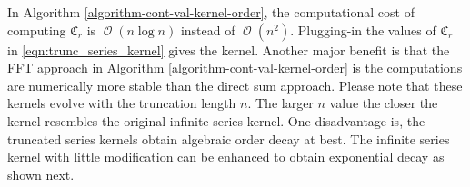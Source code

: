 \documentclass{svjour3}                     %
\DeclareMathOperator{\Order}{{\mathcal O}}
\newcommand{\bm}[1]{\boldsymbol{#1}}
\begin{document}
In Algorithm \ref{algorithm-cont-val-kernel-order}, the computational cost of  computing ${\bm{\mathfrak{C}}}_r$ %
is $\Order(n \log n)$ instead of $\Order(n^2)$. Plugging-in the values of ${\bm{\mathfrak{C}}}_r$ in \eqref{eqn:trunc_series_kernel} gives the kernel. Another major benefit is that the FFT approach in Algorithm \ref{algorithm-cont-val-kernel-order} is the computations are numerically more stable than the direct sum approach. Please note that these kernels evolve with the truncation length $n$. The larger $n$ value the closer the kernel resembles the original infinite series kernel. One disadvantage is, the truncated series kernels obtain algebraic order decay at best. The infinite series kernel with little modification can be enhanced to obtain exponential decay as shown next.
\end{document}
